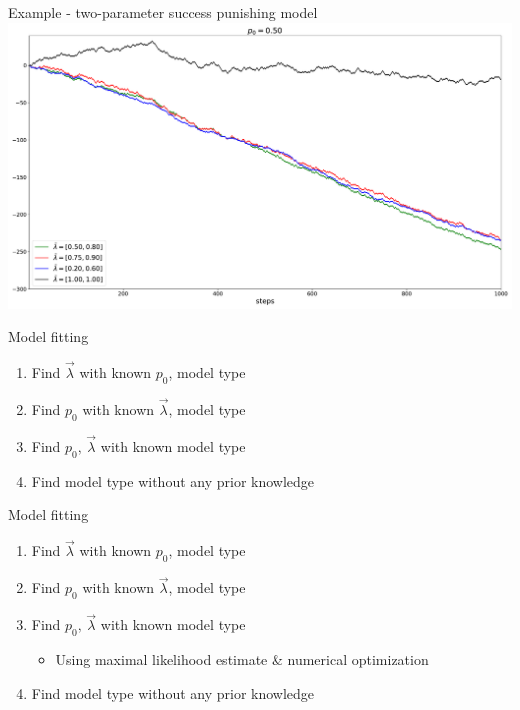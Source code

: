 \documentclass[american]{beamer}
\begin{document}
    \begin{frame}{Example - two-parameter success punishing model}
        \includegraphics[width=1\textwidth]{../../simulations/single_walk_1000_steps_type_success_punished_two_lambdas}
    \end{frame}

    \begin{frame}{Model fitting}
        \begin{enumerate}
            \item Find $\overrightarrow{\lambda}$ with known $p_{0}$, model type
            \item Find $p_{0}$ with known $\overrightarrow{\lambda}$, model type
            \item Find $p_{0},\,\overrightarrow{\lambda}$ with known model type
            \item Find model type without any prior knowledge
        \end{enumerate}
    \end{frame}

    \begin{frame}{Model fitting}
        \begin{enumerate}
            \item Find $\overrightarrow{\lambda}$ with known $p_{0}$, model type
            \item Find $p_{0}$ with known $\overrightarrow{\lambda}$, model type
            \item Find $p_{0},\,\overrightarrow{\lambda}$ with known model type
            \begin{itemize}
                \item Using maximal likelihood estimate \& numerical optimization
            \end{itemize}
            \item Find model type without any prior knowledge
        \end{enumerate}
    \end{frame}
\end{document}
